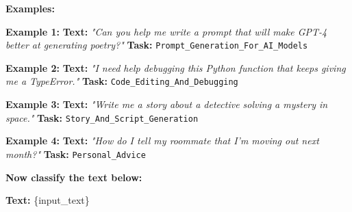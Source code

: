 \begin{tcolorbox}
\textbf{Examples:}

\textbf{Example 1:}  
\textbf{Text:} \textit{"Can you help me write a prompt that will make GPT-4 better at generating poetry?"}  
\textbf{Task:} \texttt{Prompt\_Generation\_For\_AI\_Models}

\textbf{Example 2:}  
\textbf{Text:} \textit{"I need help debugging this Python function that keeps giving me a TypeError."}  
\textbf{Task:} \texttt{Code\_Editing\_And\_Debugging}

\textbf{Example 3:}  
\textbf{Text:} \textit{"Write me a story about a detective solving a mystery in space."}  
\textbf{Task:} \texttt{Story\_And\_Script\_Generation}

\textbf{Example 4:}  
\textbf{Text:} \textit{"How do I tell my roommate that I'm moving out next month?"}  
\textbf{Task:} \texttt{Personal\_Advice}

\textbf{Now classify the text below:}  

\textbf{Text:} \{input\_text\}

\end{tcolorbox}

